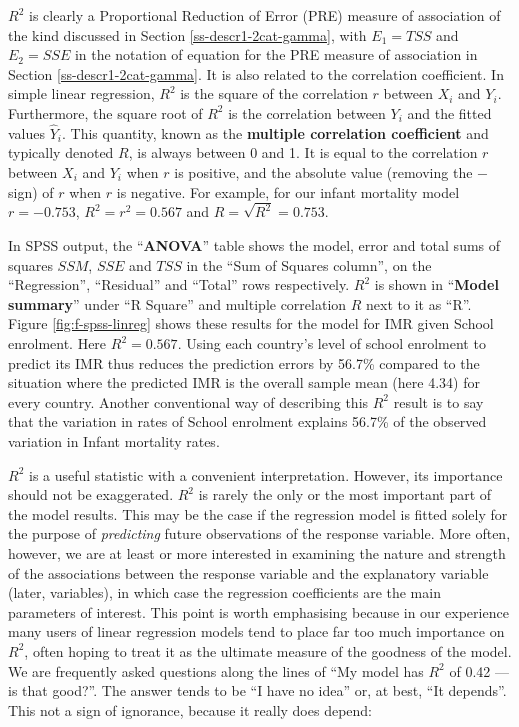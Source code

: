\documentclass[11pt,a4paper,openany]{book}
\begin{document}
\(R^{2}\) is clearly a Proportional Reduction of Error (PRE) measure of
association of the kind discussed in Section \ref{ss-descr1-2cat-gamma},
with \(E_{1}=TSS\) and \(E_{2}=SSE\) in the notation of equation for the
PRE measure of association in Section \ref{ss-descr1-2cat-gamma}. It is
also related to the correlation coefficient. In simple linear
regression, \(R^{2}\) is the square of the correlation \(r\) between
\(X_{i}\) and \(Y_{i}\). Furthermore, the square root of \(R^{2}\) is
the correlation between \(Y_{i}\) and the fitted values \(\hat{Y}_{i}\).
This quantity, known as the \textbf{multiple correlation coefficient}
and typically denoted \(R\), is always between 0 and 1. It is equal to
the correlation \(r\) between \(X_{i}\) and \(Y_{i}\) when \(r\) is
positive, and the absolute value (removing the \(-\) sign) of \(r\) when
\(r\) is negative. For example, for our infant mortality model
\(r=-0.753\), \(R^{2}=r^{2}=0.567\) and \(R=\sqrt{R^{2}}=0.753\).

In SPSS output, the ``\textbf{ANOVA}'' table shows the model, error and
total sums of squares \(SSM\), \(SSE\) and \(TSS\) in the ``Sum of
Squares column'', on the ``Regression'', ``Residual'' and ``Total'' rows
respectively. \(R^{2}\) is shown in ``\textbf{Model summary}'' under ``R
Square'' and multiple correlation \(R\) next to it as ``R''. Figure
\ref{fig:f-spss-linreg} shows these results for the model for IMR given
School enrolment. Here \(R^{2}=0.567\). Using each country's level of
school enrolment to predict its IMR thus reduces the prediction errors
by 56.7\% compared to the situation where the predicted IMR is the
overall sample mean (here 4.34) for every country. Another conventional
way of describing this \(R^{2}\) result is to say that the variation in
rates of School enrolment explains 56.7\% of the observed variation in
Infant mortality rates.

\(R^{2}\) is a useful statistic with a convenient interpretation.
However, its importance should not be exaggerated. \(R^{2}\) is rarely
the only or the most important part of the model results. This may be
the case if the regression model is fitted solely for the purpose of
\emph{predicting} future observations of the response variable. More
often, however, we are at least or more interested in examining the
nature and strength of the associations between the response variable
and the explanatory variable (later, variables), in which case the
regression coefficients are the main parameters of interest. This point
is worth emphasising because in our experience many users of linear
regression models tend to place far too much importance on \(R^{2}\),
often hoping to treat it as the ultimate measure of the goodness of the
model. We are frequently asked questions along the lines of ``My model
has \(R^{2}\) of 0.42 --- is that good?''. The answer tends to be ``I
have no idea'' or, at best, ``It depends''. This not a sign of
ignorance, because it really does depend:
\end{document}
